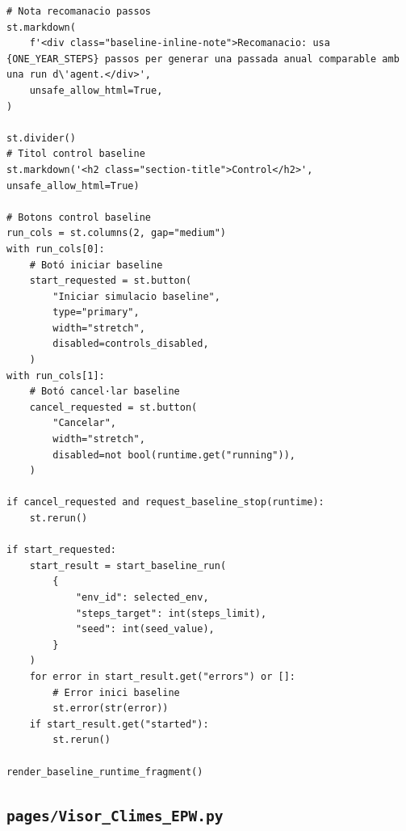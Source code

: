 \documentclass[10pt,a4paper]{article}
\begin{document}
\begin{lstlisting}[style=studioPython,caption={pages/Simular\_Entorn.py},label={lst:pages-simular-entorn-py}]
# Nota recomanacio passos
st.markdown(
    f'<div class="baseline-inline-note">Recomanacio: usa {ONE_YEAR_STEPS} passos per generar una passada anual comparable amb una run d\'agent.</div>',
    unsafe_allow_html=True,
)

st.divider()
# Titol control baseline
st.markdown('<h2 class="section-title">Control</h2>', unsafe_allow_html=True)

# Botons control baseline
run_cols = st.columns(2, gap="medium")
with run_cols[0]:
    # Botó iniciar baseline
    start_requested = st.button(
        "Iniciar simulacio baseline",
        type="primary",
        width="stretch",
        disabled=controls_disabled,
    )
with run_cols[1]:
    # Botó cancel·lar baseline
    cancel_requested = st.button(
        "Cancelar",
        width="stretch",
        disabled=not bool(runtime.get("running")),
    )

if cancel_requested and request_baseline_stop(runtime):
    st.rerun()

if start_requested:
    start_result = start_baseline_run(
        {
            "env_id": selected_env,
            "steps_target": int(steps_limit),
            "seed": int(seed_value),
        }
    )
    for error in start_result.get("errors") or []:
        # Error inici baseline
        st.error(str(error))
    if start_result.get("started"):
        st.rerun()

render_baseline_runtime_fragment()
\end{lstlisting}


\subsection{\texorpdfstring{\texttt{pages/Visor\_Climes\_EPW.py}}{pages/Visor\_Climes\_EPW.py}}
\end{document}
